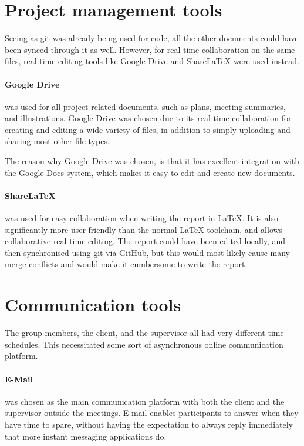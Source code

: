 \section{Project management tools}
Seeing as git was already being used for code, all the other documents could have been synced through it as well. However, for real-time collaboration on the same files, real-time editing tools like Google Drive and ShareLaTeX were used instead.

\paragraph{Google Drive} was used for all project related documents, such as plans, meeting summaries, and illustrations. Google Drive was chosen due to its real-time collaboration for creating and editing a wide variety of files, in addition to simply uploading and sharing most other file types.

The reason why Google Drive was chosen, is that it has excellent integration with the Google Docs system, which makes it easy to edit and create new documents.

\paragraph{ShareLaTeX} was used for easy collaboration when writing the report in LaTeX. It is also significantly more user friendly than the normal LaTeX toolchain, and allows collaborative real-time editing. The report could have been edited locally, and then synchronised using git via GitHub, but this would most likely cause many merge conflicts and would make it cumbersome to write the report. 

\section{Communication tools}
\label{sectionCommunicationTools}
The group members, the client, and the supervisor all had very different time schedules. This necessitated some sort of asynchronous online communication platform. 

\paragraph{E-Mail} was chosen as the main communication platform with both the client and the supervisor outside the meetings. E-mail enables participants to answer when they have time to spare, without having the expectation to always reply immediately that more instant messaging applications do. 

